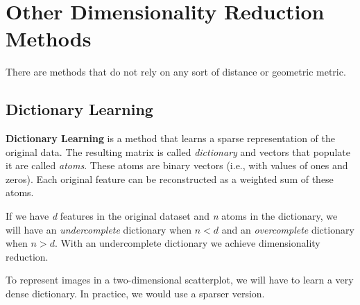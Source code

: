 \documentclass[11pt]{article}
\begin{document}
    \section{Other Dimensionality Reduction
Methods}\label{other-dimensionality-reduction-methods}

There are methods that do not rely on any sort of distance or geometric
metric.

\subsection{Dictionary Learning}\label{dictionary-learning}

\textbf{Dictionary Learning} is a method that learns a sparse
representation of the original data. The resulting matrix is called
\emph{dictionary} and vectors that populate it are called \emph{atoms}.
These atoms are binary vectors (i.e., with values of ones and zeros).
Each original feature can be reconstructed as a weighted sum of these
atoms.

If we have \emph{d} features in the original dataset and \emph{n} atoms
in the dictionary, we will have an \emph{undercomplete} dictionary when
\(n < d\) and an \emph{overcomplete} dictionary when \(n>d\). With an
undercomplete dictionary we achieve dimensionality reduction.

To represent images in a two-dimensional scatterplot, we will have to
learn a very dense dictionary. In practice, we would use a sparser
version.
\end{document}
